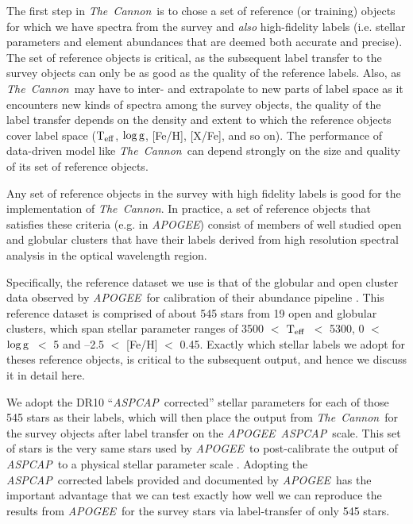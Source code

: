 \documentclass[12pt, preprint]{aastex}
\newcommand{\teff}{\mbox{$\rm T_{eff}$}}
\newcommand{\logg}{\mbox{$\rm \log g$}}
\newcommand{\tc}{\textsl{The~Cannon}}
\newcommand{\apogee}{\textsl{APOGEE}}
\newcommand{\aspcap}{\textsl{ASPCAP}}
\begin{document}
The first step in \tc\ is to chose a set of reference (or training) objects for which we have spectra from the survey and 
\emph{also} high-fidelity labels (i.e. stellar parameters and element abundances that are deemed both accurate and precise). 
The set of reference objects is critical, as the subsequent label transfer to the survey objects can only be as good as the quality 
of the reference labels. 
Also, as \tc\ may have to inter- and extrapolate to new parts of label space as
it encounters new kinds of spectra among the survey objects, the quality
of the label transfer depends on the density and extent to which the reference objects
cover label space (\teff, \logg, [Fe/H], [X/Fe], and so on). 
The performance of data-driven model like \tc\ can depend strongly on the size and quality of its set of reference objects.

Any set of reference objects in the survey with high fidelity labels is good for the implementation of \tc.
In practice, a set of reference objects that satisfies these criteria (e.g. in \apogee )
consist of members of well studied open and globular clusters that have their labels derived from high resolution spectral analysis in the
optical wavelength region.

Specifically, the reference dataset we use is that of the globular and open cluster data observed by \apogee\ for calibration of their abundance pipeline \citep{Meszaros2013}. 
This reference dataset is comprised of about 545 stars from 19 open and globular clusters, which span stellar parameter ranges 
of 3500 $<$ \teff\ $<$ 5300, 0 $<$ \logg\ $<$ 5 and --2.5 $<$ [Fe/H] $<$ 0.45. 
Exactly which stellar labels we adopt for theses reference objects, is critical to the subsequent output, and hence we discuss it in detail here.


We adopt the DR10 ``\aspcap\ corrected'' stellar parameters for each of those 545 stars as their labels, 
which will then place the output from \tc\ for the survey objects after label transfer on the \apogee\ \aspcap\ scale.
 This set of stars is the very same stars used by \apogee\ to post-calibrate the output of \aspcap\ to a physical stellar parameter scale \citep{Meszaros2013}.
Adopting the \aspcap\ corrected labels provided and documented by \apogee\ has the important advantage 
that we can test exactly how well we can reproduce the results from \apogee\ for the survey stars via label-transfer of only 545 stars.
\end{document}
